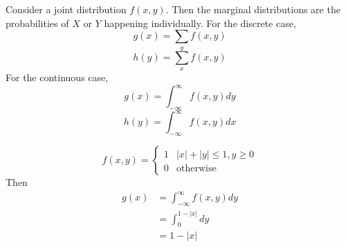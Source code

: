 \documentclass[12pt]{article}
\begin{document}
Consider a joint distribution $f(x,y)$. Then the marginal distributions are the probabilities of $X$ or $Y$ happening individually. For the discrete case,
$$g(x) = \sum_y f(x,y)$$
$$h(y) = \sum_x f(x,y)$$
For the continuous case,
$$g(x) = \int_{-\infty}^\infty f(x,y)dy$$
$$h(y) = \int_{-\infty}^\infty f(x,y)dx$$

\begin{ex}
	$$f(x,y) = \begin{cases} 1 & |x|+|y|\leq 1,y\geq 0 \\ 0 & \text{otherwise}\end{cases}$$
	Then
	\begin{align*}
		g(x) &= \int_{-\infty}^\infty f(x,y)dy \\
		     &= \int_0^{1-|x|}dy \\
		     &= 1-|x|
	\end{align*}
\end{ex}
\end{document}
